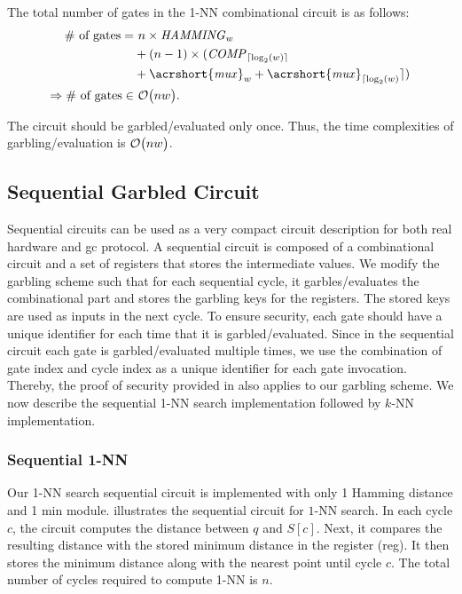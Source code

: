 The total number of gates in the 1-NN combinational circuit is as follows:
\begin{align*}
\text{\# of gates} =& ~	n \times \mathit{HAMMING}_{w}\\
					& + (n-1) \times (\mathit{COMP}_{\lceil \log _2(w) \rceil} \\
					& + \mathit{\acrshort{mux}}_w + \mathit{\acrshort{mux}}_{\lceil \log _2(w)} \rceil)\\
\Rightarrow \text{\# of gates} \in & ~\BigO{nw}.
\end{align*}

The circuit should be garbled/evaluated only once.
Thus, the time complexities of garbling/evaluation is $\mathcal{O}\bigl(nw\bigr)$.

\subsection{Sequential Garbled Circuit}\label{ssec:knn-seqgc}
Sequential circuits can be used as a very compact circuit description for both real hardware and \acrshort{gc} protocol.
A sequential circuit is composed of a combinational circuit and a set of registers that stores the intermediate values.
We modify the garbling scheme such that for each sequential cycle, it garbles/evaluates the combinational part and stores the garbling keys for the registers.
The stored keys are used as inputs in the next cycle.
To ensure security, each gate should have a unique identifier for each time that it is garbled/evaluated.
Since in the sequential circuit each gate is garbled/evaluated multiple times, we use the combination of gate index and cycle index as a unique identifier for each gate invocation.
Thereby, the proof of security provided in \cite{lindell2009proof,bellare2013efficient} also applies to our garbling scheme.
We now describe the sequential 1-NN search implementation followed by $k$-NN implementation.

\subsubsection{Sequential 1-NN}
Our 1-NN search sequential circuit is implemented with only 1 Hamming distance and 1 min module.
 illustrates the sequential circuit for $1$-NN search.
In each cycle $c$, the circuit computes the distance between $q$ and $S[c]$.
Next, it compares the resulting distance with the stored minimum distance in the register (reg).
It then stores the minimum distance along with the nearest point until cycle $c$.
The total number of cycles required to compute 1-NN is $n$.


